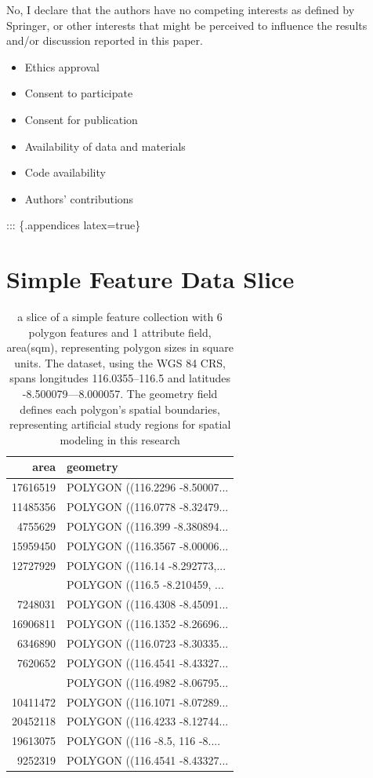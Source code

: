 \documentclass[
  default,
]{sn-jnl}
\providecommand{\tightlist}{%
  \setlength{\itemsep}{0pt}\setlength{\parskip}{0pt}}\usepackage{longtable,booktabs,array}
\begin{document}
No, I declare that the authors have no competing interests as defined by
Springer, or other interests that might be perceived to influence the
results and/or discussion reported in this paper.

\begin{itemize}
\tightlist
\item
  Ethics approval
\item
  Consent to participate
\item
  Consent for publication
\item
  Availability of data and materials
\item
  Code availability
\item
  Authors' contributions
\end{itemize}

::: \{.appendices latex=true\}

\section{Simple Feature Data Slice}\label{secA1}

\begin{longtable}[t]{rl}

\caption{\label{tbl-geoartfex}a slice of a simple feature collection
with 6 polygon features and 1 attribute field, area(sqm), representing
polygon sizes in square units. The dataset, using the WGS 84 CRS, spans
longitudes 116.0355--116.5 and latitudes -8.500079---8.000057. The
geometry field defines each polygon's spatial boundaries, representing
artificial study regions for spatial modeling in this research}

\tabularnewline

\toprule
area & geometry\\
\midrule
17616519 & POLYGON ((116.2296 -8.50007...\\
11485356 & POLYGON ((116.0778 -8.32479...\\
4755629 & POLYGON ((116.399 -8.380894...\\
15959450 & POLYGON ((116.3567 -8.00006...\\
12727929 & POLYGON ((116.14 -8.292773,...\\
\addlinespace
8848979 & POLYGON ((116.5 -8.210459, ...\\
7248031 & POLYGON ((116.4308 -8.45091...\\
16906811 & POLYGON ((116.1352 -8.26696...\\
6346890 & POLYGON ((116.0723 -8.30335...\\
7620652 & POLYGON ((116.4541 -8.43327...\\
\addlinespace
10987363 & POLYGON ((116.4982 -8.06795...\\
10411472 & POLYGON ((116.1071 -8.07289...\\
20452118 & POLYGON ((116.4233 -8.12744...\\
19613075 & POLYGON ((116 -8.5, 116 -8....\\
9252319 & POLYGON ((116.4541 -8.43327...\\
\bottomrule

\end{longtable}
\end{document}
